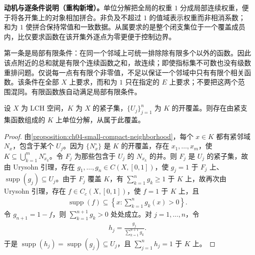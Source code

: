 \documentclass[../../main.tex]{subfiles}%
\begin{document}
\begin{remark}
\textbf{动机与逐条件说明（重构新增）。}单位分解把全局的权重 $1$ 分成局部连续权重，便于将各开集上的对象相加拼合。非负及不超过 $1$ 的值域表示权重而非相消系数；和为 $1$ 使拼合保持常值和一致数据。从属要求的是整个闭支集位于一个覆盖成员内，比仅要求函数在该开集外逐点为零更便于控制边界。

第一条是局部有限条件：在同一个邻域上可统一排除除有限多个以外的函数。因此该点附近的总和就是有限个连续函数之和，故连续；即使指标集不可数也没有级数重排问题。仅说每一点有有限个非零值，不足以保证一个邻域中只有有限个相关函数。该条件在全部 $X$ 上要求，而和为 $1$ 只在指定的 $E$ 上要求；不要把这两个范围混同。有限函数族自动满足局部有限条件。
\end{remark}
\begin{proposition}\label{proposition:ch04-finite-partition-unity}
设 $X$ 为 LCH 空间，$K$ 为 $X$ 的紧子集，$\{U_j\}_{j=1}^n$ 为 $K$ 的开覆盖。则存在由紧支集函数组成的 $K$ 上单位分解，从属于此覆盖。
\end{proposition}
\begin{proof}
由\cref{proposition:ch04-small-compact-neighborhood}，每个 $x\in K$ 都有紧邻域 $N_x$，包含于某个 $U_j$。因为 $\{N_x^\circ\}$ 是 $K$ 的开覆盖，存在 $x_1,\ldots,x_m$，使 $K\subseteq\bigcup_{k=1}^mN_{x_k}^\circ$。令 $F_j$ 为那些包含于 $U_j$ 的 $N_{x_k}$ 的并。则 $F_j$ 是 $U_j$ 的紧子集，故由 Urysohn 引理，存在 $g_1,\ldots,g_n\in C(X,[0,1])$，使 $g_j=1$ 于 $F_j$ 上、$\operatorname{supp}(g_j)\subseteq U_j$。由于 $F_j$ 覆盖 $K$，有 $\sum_{k=1}^ng_k\ge1$ 于 $K$ 上，故再次由 Urysohn 引理，存在 $f\in C_c(X,[0,1])$，使 $f=1$ 于 $K$ 上，且
\begin{align*}
\operatorname{supp}(f)\subseteq\left\{x:\sum_{k=1}^ng_k(x)>0\right\}.
\end{align*}
令 $g_{n+1}=1-f$，则 $\sum_{k=1}^{n+1}g_k>0$ 处处成立。对 $j=1,\ldots,n$，令
\begin{align*}
h_j=\frac{g_j}{\sum_{k=1}^{n+1}g_k}.
\end{align*}
于是 $\operatorname{supp}(h_j)=\operatorname{supp}(g_j)\subseteq U_j$，且 $\sum_{j=1}^nh_j=1$ 于 $K$ 上。
\end{proof}
\end{document}
